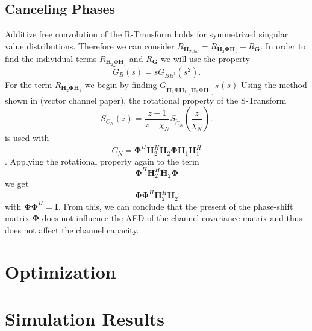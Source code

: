 \documentclass[12pt,a4paper]{report}
\begin{document}
\subsection{Canceling Phases}
Additive free convolution of the R-Transform holds for symmetrized singular value distributions. Therefore we can consider $R_{\mathbf{H}_{Total}} = R_{\mathbf{H}_{2}\boldsymbol{\Phi}\mathbf{H}_{1}} + R_{\mathbf{G}}$. In order to find the individual terms $R_{\mathbf{H}_{2}\boldsymbol{\Phi}\mathbf{H}_{1}}$ and $R_{\mathbf{G}}$ we will use the property 
\begin{equation}
\tilde{G}_{B}(s) = sG_{BB^{\dagger}}(s^2).
\end{equation}
For the term $R_{\mathbf{H}_{2}\boldsymbol{\Phi}\mathbf{H}_{1}}$ we begin by finding 
$G_{\mathbf{H}_{2}\boldsymbol{\Phi}\mathbf{H}_{1}[\mathbf{H}_{2}\boldsymbol{\Phi}\mathbf{H}_{1}]^H}(s)$ 
Using the method shown in (vector channel paper), the rotational property of the S-Transform
\begin{equation}
S_{C_N}(z) = \frac{z+1}{z+\chi_N} S_{\tilde{C}_N}(\frac{z}{\chi_N}).
\end{equation}
is used with 
\begin{equation}
\tilde{C}_N = \boldsymbol{\Phi}^H\mathbf{H}_{2}^H\mathbf{H}_{2}\boldsymbol{\Phi}\mathbf{H}_{1}\mathbf{H}_{1}^H
\end{equation}.
Applying the rotational property again to the term 
\begin{equation}
\boldsymbol{\Phi}^H\mathbf{H}_{2}^H\mathbf{H}_{2}\boldsymbol{\Phi}
\end{equation}
we get 
\begin{equation}
\boldsymbol{\Phi}\boldsymbol{\Phi}^H\mathbf{H}_{2}^H\mathbf{H}_{2}
\end{equation}
with $\boldsymbol{\Phi}\boldsymbol{\Phi}^H = \mathbf{I}$.
From this, we can conclude that the present of the phase-shift matrix $\boldsymbol{\Phi}$ does not influence the
AED of the channel covariance matrix and thus does not affect the channel capacity. 

\section{Optimization}



\section{Simulation Results}
\end{document}
